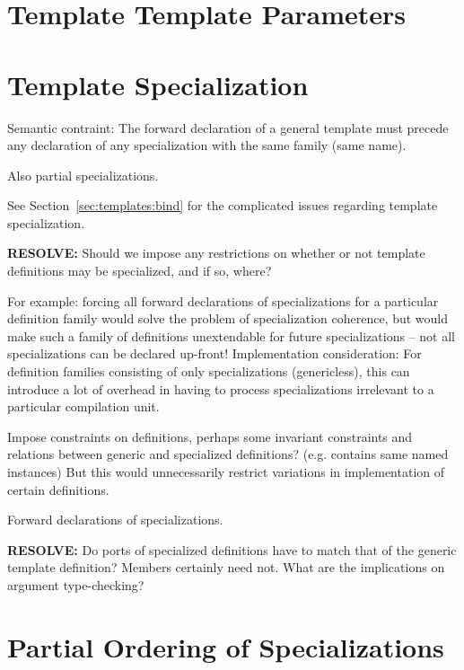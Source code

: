\section{Template Template Parameters}
\label{sec:templates:ttp}


\section{Template Specialization}
\label{sec:templates:spec}

Semantic contraint:
The forward declaration of a general template must precede any declaration
of any specialization with the same family (same name).  

Also partial specializations.  

See Section~\ref{sec:templates:bind} for the complicated issues regarding
template specialization.  

\textbf{RESOLVE:}
Should we impose any restrictions on whether or not template definitions
may be specialized, and if so, where?  

For example: forcing all forward declarations of specializations for 
a particular definition family would solve the problem of 
specialization coherence, but would make such a family of definitions
unextendable for future specializations -- not all specializations
can be declared up-front!  
Implementation consideration:
For definition families consisting of only specializations (genericless),
this can introduce a lot of overhead in having to process specializations
irrelevant to a particular compilation unit.  

Impose constraints on definitions, perhaps some invariant constraints and
relations between generic and specialized definitions?  (e.g. contains same
named instances)  But this would unnecessarily restrict variations in
implementation of certain definitions.  

Forward declarations of specializations.  

\textbf{RESOLVE:}
Do ports of specialized definitions have to match that of the 
generic template definition?  Members certainly need not.  
What are the implications on argument type-checking?

\section{Partial Ordering of Specializations}
\label{sec:templates:partialorder}

